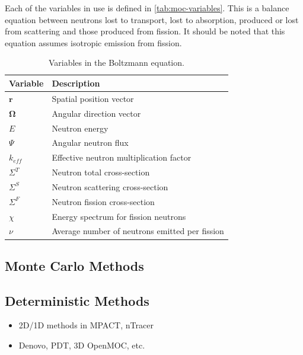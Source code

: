 Each of the variables in use is defined in \autoref{tab:moc-variables}. This is a balance equation between neutrons lost to transport, lost to absorption, produced or lost from scattering and those produced from fission. It should be noted that this equation assumes isotropic emission from fission.

\begin{table}[hbt]
  \caption{Variables in the Boltzmann equation.}
  \label{tab:chap1-variables}
  \begin{center}
    \begin{tabular}{ l l }
    \toprule
    Variable & Description \\
    \midrule
    $\mathbf{r}$ & Spatial position vector \\
    $\mathbf{\Omega}$ & Angular direction vector \\
    $E$ & Neutron energy \\
    $\Psi$ & Angular neutron flux \\
    $k_{eff}$ & Effective neutron multiplication factor \\
    $\Sigma^T$ & Neutron total cross-section \\
    $\Sigma^S$ & Neutron scattering cross-section \\
    $\Sigma^F$ & Neutron fission cross-section \\
    $\chi$ & Energy spectrum for fission neutrons \\
    $\nu$ & Average number of neutrons emitted per fission \\
    \bottomrule
  \end{tabular}
  \end{center}
\end{table}


\subsection{Monte Carlo Methods}
\label{subsec:chap1-monte-carlo}


\subsection{Deterministic Methods}
\label{subsec:chap1-deterministic}

\begin{itemize}
  \item 2D/1D methods in MPACT, nTracer
  \item Denovo, PDT, 3D OpenMOC, etc.
\end{itemize}


